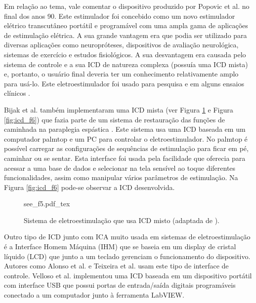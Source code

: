 Em relação ao tema, vale comentar o dispositivo produzido por Popovic et al. no final dos anos 90. Este estimulador foi concebido como um novo estimulador elétrico transcutâneo portátil e programável com uma ampla gama de aplicações de estimulação elétrica. A sua grande vantagem era que podia ser utilizado para diversas aplicações como neuropróteses, dispositivos de avaliação neurológica, sistemas de exercício e estudos fisiológicos. A sua desvantagem era causada pelo sistema de controle e a sua \acrshort{ICD} de natureza complexa (possuía uma \acrshort{ICD} mista) e, portanto, o usuário final deveria ter um conhecimento relativamente amplo para usá-lo. Este eletroestimulador foi usado para pesquisa e em alguns ensaios clínicos \cite{Popovic2001, Popovic2005}.

Bijak et al. também implementaram uma \acrshort{ICD} mista (ver Figura \ref{fig:see_f5} e Figura \ref{fig:icd_f6}) que fazia parte de um sistema de restauração das funções de caminhada na paraplegia espástica \cite{Bijak2002}. Este sistema usa uma \acrshort{ICD} baseada em um computador palmtop e um PC para controlar o eletroestimulador. No palmtop é possível carregar as configurações de sequências de estimulação para ficar em pé, caminhar ou se sentar. Esta interface foi usada pela facilidade que oferecia para acessar a uma base de dados e selecionar na tela sensível ao toque diferentes funcionalidades, assim como manipular vários parâmetros de estimulação. Na Figura \ref{fig:icd_f6} pode-se observar a \acrshort{ICD} desenvolvida.

\vspace{0.3cm}
\begin{figure}[h]
    \centering %
    \small %
    \def\svgwidth{0.6
    \columnwidth}%
    {see_f5.pdf_tex}
    \caption{Sistema de eletroestimulação que usa ICD misto (adaptada de  \cite{Bijak2002}).}
    \label{fig:see_f5}
\end{figure}

Outro tipo de \acrshort{ICD} junto com \acrshort{ICA} muito usada em sistemas de eletroestimulação é a Interface Homem Máquina (\acrshort{IHM}) que se baseia em um display de cristal líquido (\acrshort{LCD}) que junto a um teclado gerenciam o funcionamento do dispositivo. Autores como Alonso et al. \cite{Alonso2007a} e Teixeira et al. \cite{Teixeira1998} usam este tipo de interface de controle. Velloso et al. \cite{Velloso2007b} implementou uma \acrshort{ICD} baseada em um dispositivo portátil com interface USB que possui portas de entrada/saída digitais programáveis conectado a um computador junto à ferramenta LabVIEW. 

